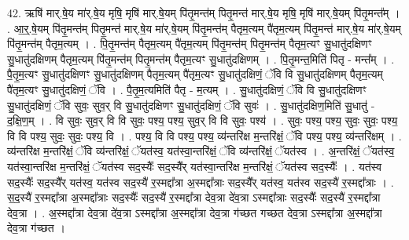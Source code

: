 \documentclass[17pt]{extarticle}
\begin{document}
42. ऋषि॑ मार्.षे॒य मा॑र्.षे॒य मृषि॒ मृषि॑ मार्.षे॒यम् पि॑तृ॒मन्त॑म् पितृ॒मन्त॑ मार्.षे॒य मृषि॒ मृषि॑ मार्.षे॒यम् पि॑तृ॒मन्त᳚म् । . आ॒र्॒.षे॒यम् पि॑तृ॒मन्त॑म् पितृ॒मन्त॑ मार्.षे॒य मा॑र्.षे॒यम् पि॑तृ॒मन्त॑म् पैतृम॒त्यम् पै॑तृम॒त्यम् पि॑तृ॒मन्त॑ मार्.षे॒य मा॑र्.षे॒यम् पि॑तृ॒मन्त॑म् पैतृम॒त्यम् । . पि॒तृ॒मन्त॑म् पैतृम॒त्यम् पै॑तृम॒त्यम् पि॑तृ॒मन्त॑म् पितृ॒मन्त॑म् पैतृम॒त्यꣳ सु॒धातु॑दक्षिणꣳ सु॒धातु॑दक्षिणम् पैतृम॒त्यम् पि॑तृ॒मन्त॑म् पितृ॒मन्त॑म् पैतृम॒त्यꣳ सु॒धातु॑दक्षिणम् । . पि॒तृ॒मन्त॒मिति॑ पितृ - मन्त᳚म् । . पै॒तृ॒म॒त्यꣳ सु॒धातु॑दक्षिणꣳ सु॒धातु॑दक्षिणम् पैतृम॒त्यम् पै॑तृम॒त्यꣳ सु॒धातु॑दक्षिणं॒ ॅवि वि सु॒धातु॑दक्षिणम् पैतृम॒त्यम् पै॑तृम॒त्यꣳ सु॒धातु॑दक्षिणं॒ ॅवि । . पै॒तृ॒म॒त्यमिति॑ पैतृ - म॒त्यम् । . सु॒धातु॑दक्षिणं॒ ॅवि वि सु॒धातु॑दक्षिणꣳ सु॒धातु॑दक्षिणं॒ ॅवि सुवः॒ सुव॒र् वि सु॒धातु॑दक्षिणꣳ सु॒धातु॑दक्षिणं॒ ॅवि सुवः॑ । . सु॒धातु॑दक्षिण॒मिति॑ सु॒धातु॑ - द॒क्षि॒ण॒म् । . वि सुवः॒ सुव॒र् वि वि सुवः॒ पश्य॒ पश्य॒ सुव॒र् वि वि सुवः॒ पश्य॑ । . सुवः॒ पश्य॒ पश्य॒ सुवः॒ सुवः॒ पश्य॒ वि वि पश्य॒ सुवः॒ सुवः॒ पश्य॒ वि । . पश्य॒ वि वि पश्य॒ पश्य॒ व्य॑न्तरि॑क्ष म॒न्तरि॑क्षं॒ ॅवि पश्य॒ पश्य॒ व्य॑न्तरि॑क्षम् । . व्य॑न्तरि॑क्ष म॒न्तरि॑क्षं॒ ॅवि व्य॑न्तरि॑क्षं॒ ॅयत॑स्व॒ यत॑स्वा॒न्तरि॑क्षं॒ ॅवि व्य॑न्तरि॑क्षं॒ ॅयत॑स्व । . अ॒न्तरि॑क्षं॒ ॅयत॑स्व॒ यत॑स्वा॒न्तरि॑क्ष म॒न्तरि॑क्षं॒ ॅयत॑स्व सद॒स्यैः᳚ सद॒स्यै᳚र् यत॑स्वा॒न्तरि॑क्ष म॒न्तरि॑क्षं॒ ॅयत॑स्व सद॒स्यैः᳚ । . यत॑स्व सद॒स्यैः᳚ सद॒स्यै᳚र् यत॑स्व॒ यत॑स्व सद॒स्यै॑ र॒स्मद्दा᳚त्रा अ॒स्मद्दा᳚त्राः सद॒स्यै᳚र् यत॑स्व॒ यत॑स्व सद॒स्यै॑ र॒स्मद्दा᳚त्राः । . स॒द॒स्यै॑ र॒स्मद्दा᳚त्रा अ॒स्मद्दा᳚त्राः सद॒स्यैः᳚ सद॒स्यै॑ र॒स्मद्दा᳚त्रा देव॒त्रा दे॑व॒त्रा ऽस्मद्दा᳚त्राः सद॒स्यैः᳚ सद॒स्यै॑ र॒स्मद्दा᳚त्रा देव॒त्रा । . अ॒स्मद्दा᳚त्रा देव॒त्रा दे॑व॒त्रा ऽस्मद्दा᳚त्रा अ॒स्मद्दा᳚त्रा देव॒त्रा ग॑च्छत गच्छत देव॒त्रा ऽस्मद्दा᳚त्रा अ॒स्मद्दा᳚त्रा देव॒त्रा ग॑च्छत । \newline
\end{document}
